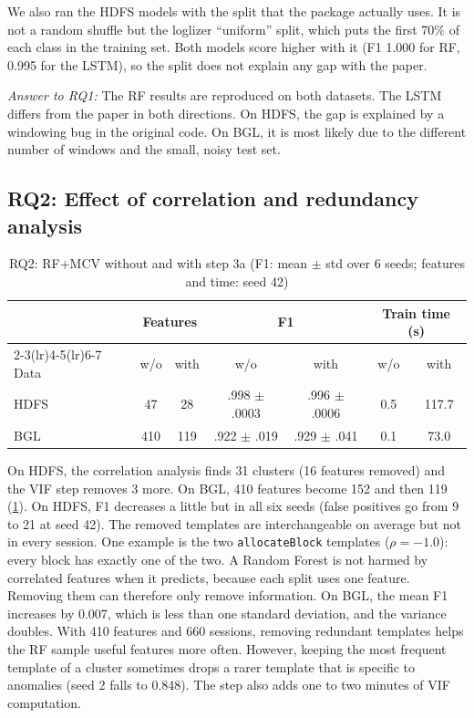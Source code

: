 \documentclass[10pt, conference]{IEEEtran}
\newcommand{\tpl}[1]{\texttt{\small #1}}
\begin{document}
We also ran the HDFS models with the split that the package actually uses. It is not a random shuffle but the loglizer ``uniform'' split, which puts the first 70\% of each class in the training set. Both models score higher with it (F1 1.000 for RF, 0.995 for the LSTM), so the split does not explain any gap with the paper.

\textit{Answer to RQ1:} The RF results are reproduced on both datasets. The LSTM differs from the paper in both directions. On HDFS, the gap is explained by a windowing bug in the original code. On BGL, it is most likely due to the different number of windows and the small, noisy test set.

\subsection{RQ2: Effect of correlation and redundancy analysis}

\begin{table}[t]
\centering
\caption{RQ2: RF+MCV without and with step 3a (F1: mean $\pm$ std over 6 seeds; features and time: seed 42)}
\label{tab:rq2}
\footnotesize
\setlength{\tabcolsep}{3pt}
\begin{tabular}{lcccccc}
\toprule
 & \multicolumn{2}{c}{Features} & \multicolumn{2}{c}{F1} & \multicolumn{2}{c}{Train time (s)} \\
\cmidrule(lr){2-3}\cmidrule(lr){4-5}\cmidrule(lr){6-7}
Data & w/o & with & w/o & with & w/o & with \\
\midrule
HDFS & 47 & 28 & .998 $\pm$ .0003 & .996 $\pm$ .0006 & 0.5 & 117.7 \\
BGL & 410 & 119 & .922 $\pm$ .019 & .929 $\pm$ .041 & 0.1 & 73.0 \\
\bottomrule
\end{tabular}
\end{table}

On HDFS, the correlation analysis finds 31 clusters (16 features removed) and the VIF step removes 3 more. On BGL, 410 features become 152 and then 119 (\cref{tab:rq2}). On HDFS, F1 decreases a little but in all six seeds (false positives go from 9 to 21 at seed 42). The removed templates are interchangeable on average but not in every session. One example is the two \tpl{allocateBlock} templates ($\rho=-1.0$): every block has exactly one of the two. A Random Forest is not harmed by correlated features when it predicts, because each split uses one feature. Removing them can therefore only remove information. On BGL, the mean F1 increases by 0.007, which is less than one standard deviation, and the variance doubles. With 410 features and 660 sessions, removing redundant templates helps the RF sample useful features more often. However, keeping the most frequent template of a cluster sometimes drops a rarer template that is specific to anomalies (seed 2 falls to 0.848). The step also adds one to two minutes of VIF computation.
\end{document}

